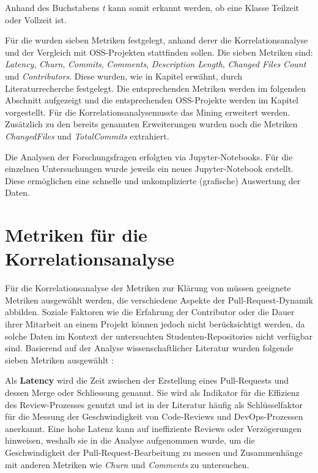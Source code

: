 Anhand des Buchstabens \textit{t} kann somit erkannt werden, ob eine Klasse Teilzeit oder Vollzeit ist.

Für die  wurden sieben Metriken festgelegt, anhand derer die Korrelationsanalyse und der Vergleich mit OSS-Projekten stattfinden sollen. Die sieben Metriken sind: \textit{Latency}, \textit{Churn}, \textit{Commits}, \textit{Comments}, \textit{Description Length}, \textit{Changed Files Count} und \textit{Contributors}. Diese wurden, wie in Kapitel  erwähnt, durch Literaturrecherche festgelegt. Die entsprechenden Metriken werden im folgenden Abschnitt  aufgezeigt und die entsprechenden OSS-Projekte werden im Kapitel  vorgestellt. Für die Korrelationsanalyse\linebreak musste das Mining erweitert werden. Zusätzlich zu den bereits genannten Erweiterungen wurden noch die Metriken \textit{ChangedFiles} und \textit{TotalCommits} extrahiert.

Die Analysen der Forschungsfragen erfolgten via Jupyter-Notebooks. Für die einzelnen Untersuchungen wurde jeweils ein neues Jupyter-Notebook erstellt. Diese ermöglichen eine schnelle und unkomplizierte (grafische) Auswertung der Daten. \parencite{noauthor_repo-detectivesba-metric-analysis-scripts_nodate}


\section{Metriken für die Korrelations\-analyse}
\label{sec:MetrikenKorrelation}
Für die Korrelationsanalyse der Metriken zur Klärung von  müssen geeignete Metriken ausgewählt werden, die verschiedene Aspekte der Pull-Request-Dynamik abbilden. Soziale Faktoren wie die Erfahrung der Contributor oder die Dauer ihrer Mitarbeit an einem Projekt können jedoch nicht berücksichtigt werden, da solche Daten im Kontext der untersuchten Studenten-Repositories nicht verfügbar sind. Basierend auf der Analyse wissenschaftlicher Literatur wurden folgende sieben Metriken ausgewählt \parencite{yu_wait_2015} \parencite{gousios_exploratory_2014} \parencite{zhang_pull_2022} \parencite{tsay_influence_2014}:

Als \textbf{Latency} wird die Zeit zwischen der Erstellung eines Pull-Requests und dessen Merge oder Schliessung genannt. Sie wird als Indikator für die Effizienz des Review-Prozesses genutzt und ist in der Literatur häufig als Schlüsselfaktor für die Messung der Geschwindigkeit von Code-Reviews und DevOps-Prozessen anerkannt. Eine hohe Latenz kann auf ineffiziente Reviews oder Verzögerungen hinweisen, weshalb sie in die Analyse aufgenommen wurde, um die Geschwindigkeit der Pull-Request-Bearbeitung zu messen und Zusammenhänge mit anderen Metriken wie \textit{Churn} und \textit{Comments} zu untersuchen. \parencite{yu_wait_2015}

